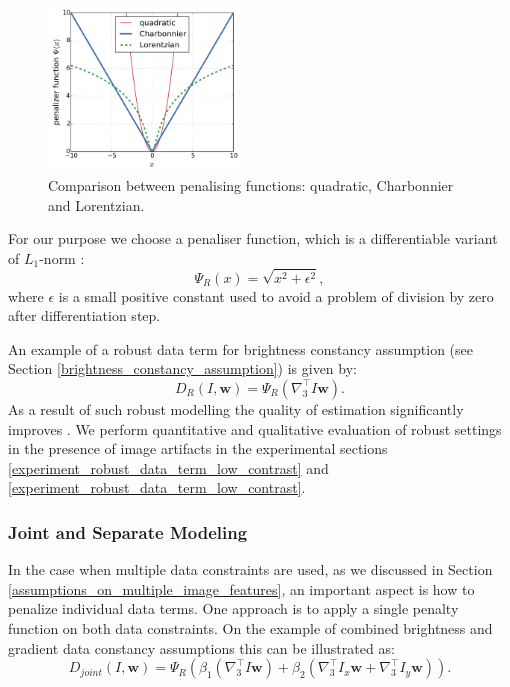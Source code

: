 \begin{figure}[ht]
  \centerline{
    \includegraphics[width=0.45\textwidth]{figures/robust_functions.pdf} 
  }  
  \caption{Comparison between penalising functions: quadratic, Charbonnier and Lorentzian.}
  \label{fig:2_penalisers}
\end{figure}
For our purpose we choose a penaliser function, which is a differentiable variant of $L_1$-norm \cite{Brox04}:
$$ \Psi_R(x) = \sqrt{x^2 + \epsilon^2},$$
where $\epsilon$ is a small positive constant used to avoid a problem of division by zero after differentiation step.

An example of a robust data term for brightness constancy assumption (see Section \ref{brightness_constancy_assumption}) is given by:
$$ D_{R}(I,\textbf{w}) = \Psi_R ( \nabla_{3}^{\top}I\textbf{w}).$$
As a result of such robust modelling the quality of \opticalflow estimation significantly improves \cite{Sun10, Middl, HarmonyFlow}. We perform quantitative and qualitative evaluation of robust settings in the presence of image artifacts in the experimental sections \ref{experiment_robust_data_term_low_contrast} and \ref{experiment_robust_data_term_low_contrast}.

\subsubsection{Joint and Separate Modeling}
\label{joint_and_separate}

In the case when multiple data constraints are used, as we discussed in Section \ref{assumptions_on_multiple_image_features}, an important aspect is how to penalize individual data terms.
One approach is to apply a single penalty function on both data constraints.  On the example of combined brightness and gradient data constancy assumptions this  can be illustrated as:
$$ D_{joint}(I,\textbf{w}) = \Psi_R (\beta_{1}( \nabla_{3}^{\top}I \textbf{w}) + 
\beta_{2} (\nabla_{3}^{\top}I_{x}\textbf{w} + \nabla_{3}^{\top}I_{y}\textbf{w})). $$

